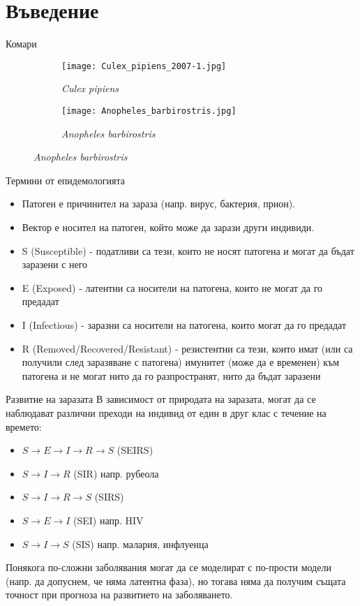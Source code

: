\section{Въведение}
\begin{frame}[t]{Комари}
  \begin{figure}[h]
    \centering
    \begin{subfigure}{0.5\textwidth}
      \centering
      \texttt{[image: Culex\_pipiens\_2007-1.jpg]}
      \caption{\textit{Culex pipiens}}
      \label{fig:Culex}
    \end{subfigure}%
    \begin{subfigure}{0.5\textwidth}
      \centering
      \texttt{[image: Anopheles\_barbirostris.jpg]}
      \caption{\textit{Anopheles barbirostris}}
      \label{fig:Anopheles}
    \end{subfigure}
  \end{figure}
\end{frame}

\begin{frame}[t]{Термини от епидемологията}
  \begin{itemize}
    \item Патоген е причинител на зараза (напр. вирус, бактерия, прион).
    \item Вектор е носител на патоген, който може да зарази други индивиди.
    \item S (Susceptible) - податливи са тези, които не носят патогена и могат да бъдат заразени с него
    \item E (Exposed) - латентни са носители на патогена, които не могат да го предадат
    \item I (Infectious) - заразни са носители на патогена, които могат да го предадат
    \item R (Removed/Recovered/Resistant) - резистентни са тези, които имат (или са получили след заразяване с патогена) имунитет (може да е временен) към патогена и не могат нито да го разпространят, нито да бъдат заразени
  \end{itemize}
\end{frame}

\begin{frame}[t]{Развитие на заразата}
  В зависимост от природата на заразата, могат да се наблюдават различни преходи на индивид от един в друг клас с течение на времето:
  \begin{itemize}
    \item $S \rightarrow E \rightarrow I \rightarrow R \rightarrow S$ (SEIRS)
    \item $S \rightarrow I \rightarrow R$ (SIR) напр. рубеола
    \item $S \rightarrow I \rightarrow R \rightarrow S$ (SIRS)
    \item $S \rightarrow E \rightarrow I$ (SEI) напр. HIV
    \item $S \rightarrow I \rightarrow S$ (SIS) напр. малария, инфлуенца
  \end{itemize}
  Понякога по-сложни заболявания могат да се моделират с по-прости модели (напр. да допуснем, че няма латентна фаза), но тогава няма да получим същата точност при прогноза на развитието на заболяването.
\end{frame}

